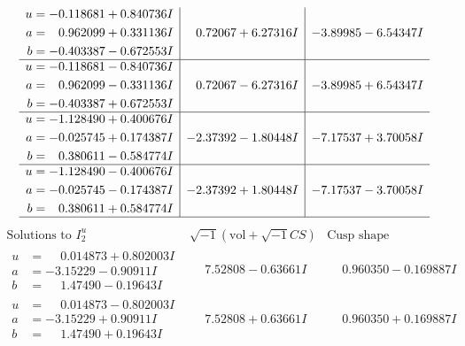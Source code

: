 \documentclass[1p]{elsarticle_modified}
\theoremstyle{definition}
\newcommand{\I}{\sqrt{-1}}
\begin{document}
$$\begin{array}{c|c|c}
\begin{aligned}
u &= -0.118681 + 0.840736 I \\
a &= \phantom{-}0.962099 + 0.331136 I \\
b &= -0.403387 - 0.672553 I\end{aligned}
 & \phantom{-}0.72067 + 6.27316 I & -3.89985 - 6.54347 I \\ \hline\begin{aligned}
u &= -0.118681 - 0.840736 I \\
a &= \phantom{-}0.962099 - 0.331136 I \\
b &= -0.403387 + 0.672553 I\end{aligned}
 & \phantom{-}0.72067 - 6.27316 I & -3.89985 + 6.54347 I \\ \hline\begin{aligned}
u &= -1.128490 + 0.400676 I \\
a &= -0.025745 + 0.174387 I \\
b &= \phantom{-}0.380611 - 0.584774 I\end{aligned}
 & -2.37392 - 1.80448 I & -7.17537 + 3.70058 I \\ \hline\begin{aligned}
u &= -1.128490 - 0.400676 I \\
a &= -0.025745 - 0.174387 I \\
b &= \phantom{-}0.380611 + 0.584774 I\end{aligned}
 & -2.37392 + 1.80448 I & -7.17537 - 3.70058 I\\
 \hline 
 \end{array}$$\newpage$$\begin{array}{c|c|c}  
\text{Solutions to }I^u_{2}& \I (\text{vol} + \sqrt{-1}CS) & \text{Cusp shape}\\
 \hline 
\begin{aligned}
u &= \phantom{-}0.014873 + 0.802003 I \\
a &= -3.15229 - 0.90911 I \\
b &= \phantom{-}1.47490 - 0.19643 I\end{aligned}
 & \phantom{-}7.52808 - 0.63661 I & \phantom{-}0.960350 - 0.169887 I \\ \hline\begin{aligned}
u &= \phantom{-}0.014873 - 0.802003 I \\
a &= -3.15229 + 0.90911 I \\
b &= \phantom{-}1.47490 + 0.19643 I\end{aligned}
 & \phantom{-}7.52808 + 0.63661 I & \phantom{-}0.960350 + 0.169887 I \\ \hline\begin{aligned}

\end{aligned}
\end{array}$$
\end{document}
